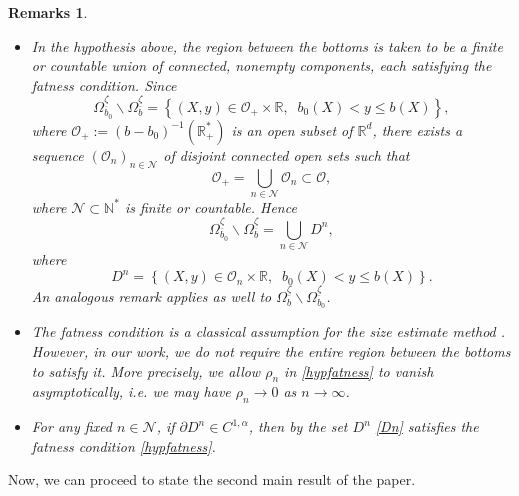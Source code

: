 \documentclass[11pt]{article}
\newtheorem{remarks}[theorem]{Remarks}
\begin{document}
\begin{remarks}$\,$\\
    \begin{itemize}
    \item %
In the hypothesis above, the region between the bottoms is taken to be a finite or countable union of connected, nonempty components, each satisfying the fatness condition. Since
\begin{equation*}
\Omega_{b_0}^{\underline{\zeta}}\backslash \Omega_{b}^{\underline{\zeta}} = \left\{ (X,y)\in {\mathcal O }_+\times\mathbb{R},\;\; b_0(X)<y\le b(X) \right\}, 
\end{equation*}
where ${\mathcal O } _+:=(b-b_0)^{-1}\left(\mathbb{R}^{*}_{+}\right)$  is an open subset of $\mathbb{R}^d$, there exists a sequence $(\mathcal O _n)_{n\in \mathcal N}$ of disjoint connected open sets such that $${\mathcal O} _+=\bigcup_{n\in \mathcal N} {\mathcal O} _n\subset {\mathcal O},$$
	where ${\mathcal N}\subset {\mathbb N}^*$ is finite or countable. Hence
	$$\Omega_{b_0}^{\underline{\zeta}}\backslash \Omega_{b}^{\underline{\zeta}}=\bigcup_{n\in \mathcal N}D^n,$$
	where
    \begin{equation}\label{Dn}
        D^n=\left\{ (X,y)\in  {\mathcal O} _n\times\mathbb{R},\;\; b_0(X)<y\leq b(X) \right\}.
    \end{equation}
An analogous remark applies as well to $\Omega_{b}^{\underline{\zeta}}\backslash \Omega_{b_0}^{\underline{\zeta}}$.
\item The fatness condition is a classical assumption for the size estimate method \cite{alessandrini2002detecting,beretta2017size,lecaros2020stability,morassi2007size}. However, in our work, we do not require the entire region between the bottoms to satisfy it.  More precisely, we allow $\rho_n$ in \eqref{hypfatness} to vanish asymptotically, i.e.  we may have $\rho_n \to 0$ as $n \to \infty$.

\item For any fixed $n\in {\mathcal N}$, if $\partial D^n \in C^{1,\alpha}$, then by \cite[Lemma 2.8]{rosset1998inverse} the set $D^n$ \eqref{Dn} satisfies the fatness condition \eqref{hypfatness}.


   
    \end{itemize}
\end{remarks}

Now, we can proceed to state the second main result of the paper.
\end{document}

